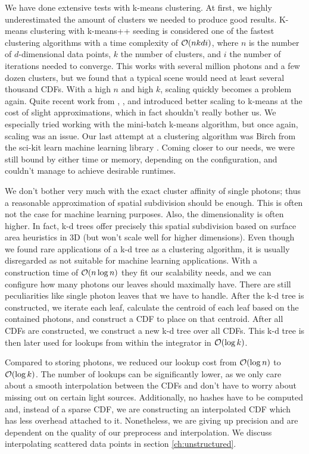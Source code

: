 We have done extensive tests with k-means clustering. At first, we highly underestimated the amount of clusters we needed to produce good results. K-means clustering with k-means++ seeding \parencite{DBLP:conf/soda/ArthurV07} is considered one of the fastest clustering algorithms with a time complexity of $\mathcal{O}(nkdi)$, where $n$ is the number of $d$-dimensional data points, $k$ the number of clusters, and $i$ the number of iterations needed to converge. This works with several million photons and a few dozen clusters, but we found that a typical scene would need at least several thousand CDFs. With a high $n$ and high $k$, scaling quickly becomes a problem again. Quite recent work from \textcite{DBLP:conf/kse/HieuM14}, \textcite{DBLP:journals/tpds/XuQLMLL14}, and \textcite{DBLP:conf/www/Sculley10} introduced better scaling to k-means at the cost of slight approximations, which in fact shouldn't really bother us. We especially tried working with the mini-batch k-means algorithm, but once again, scaling was an issue. Our last attempt at a clustering algorithm was Birch \parencite{DBLP:conf/sigmod/ZhangRL96} from the sci-kit learn machine learning library \parencite{scikit-learn}. Coming closer to our needs, we were still bound by either time or memory, depending on the configuration, and couldn't manage to achieve desirable runtimes.

We don't bother very much with the exact cluster affinity of single photons; thus a reasonable approximation of spatial subdivision should be enough. This is often not the case for machine learning purposes. Also, the dimensionality is often higher. In fact, k-d trees offer precisely this spatial subdivision based on surface area heuristics in 3D (but won't scale well for higher dimensions). Even though we found rare applications of a k-d tree as a clustering algorithm, it is usually disregarded as not suitable for machine learning applications. With a construction time of $\mathcal{O}(n \log n)$ they fit our scalability needs, and we can configure how many photons our leaves should maximally have. There are still peculiarities like single photon leaves that we have to handle. After the k-d tree is constructed, we iterate each leaf, calculate the centroid of each leaf based on the contained photons, and construct a CDF to place on that centroid. After all CDFs are constructed, we construct a new k-d tree over all CDFs. This k-d tree is then later used for lookups from within the integrator in $\mathcal{O}(\log k)$.

Compared to storing photons, we reduced our lookup cost from $\mathcal{O}(\log n)$ to $\mathcal{O}(\log k)$. The number of lookups can be significantly lower, as we only care about a smooth interpolation between the CDFs and don't have to worry about missing out on certain light sources. Additionally, no hashes have to be computed and, instead of a sparse CDF, we are constructing an interpolated CDF which has less overhead attached to it. Nonetheless, we are giving up precision and are dependent on the quality of our preprocess and interpolation. We discuss interpolating scattered data points in section \ref{ch:unstructured}.

